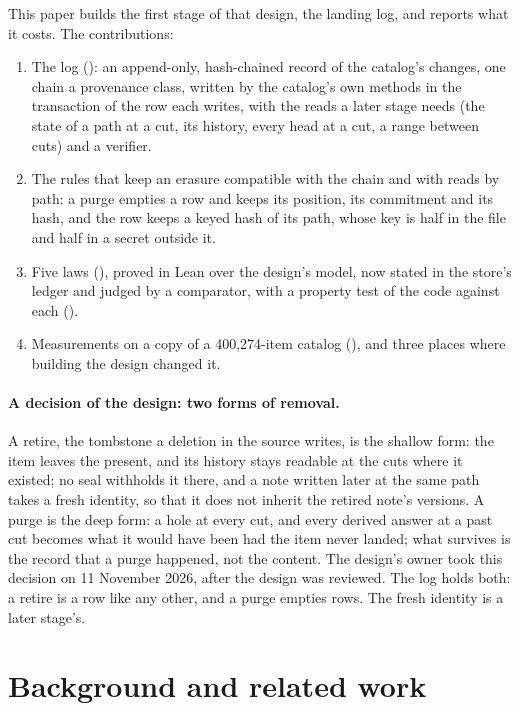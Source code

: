 \documentclass[11pt]{article}
\theoremstyle{plain}
\theoremstyle{definition}
\begin{document}
This paper builds the first stage of that design, the landing log, and reports what it costs.
The contributions:
\begin{enumerate}
\item The log (): an append-only, hash-chained record of the catalog's changes, one
  chain a provenance class, written by the catalog's own methods in the transaction of the row
  each writes, with the reads a later stage needs (the state of a path at a cut, its history, every
  head at a cut, a range between cuts) and a verifier.
\item The rules that keep an erasure compatible with the chain and with reads by path: a purge
  empties a row and keeps its position, its commitment and its hash, and the row keeps a keyed
  hash of its path, whose key is half in the file and half in a secret outside it.
\item Five laws (), proved in Lean over the design's model, now stated in the
  store's ledger and judged by a comparator, with a property test of the code against each
  ().
\item Measurements on a copy of a 400{,}274-item catalog (), and three places where
  building the design changed it.
\end{enumerate}

\paragraph{A decision of the design: two forms of removal.}
A retire, the tombstone a deletion in the source writes, is the shallow form: the item leaves the
present, and its history stays readable at the cuts where it existed; no seal withholds it there,
and a note written later at the same path takes a fresh identity, so that it does not inherit the
retired note's versions. A purge is the deep form: a hole at every cut, and every derived answer
at a past cut becomes what it would have been had the item never landed; what survives is the
record that a purge happened, not the content. The design's owner took this decision on 11
November 2026, after the design was reviewed. The log holds both: a retire is a row like any
other, and a purge empties rows. The fresh identity is a later stage's.

\section{Background and related work}
\end{document}
